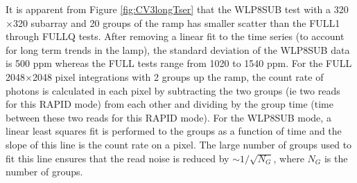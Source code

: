\documentclass{aastex62}
\begin{document}
It is apparent from Figure \ref{fig:CV3longTser} that the WLP8SUB test with a 320$\times$320 subarray and 20 groups of the ramp has smaller scatter than the FULL1 through FULLQ tests.
After removing a linear fit to the time series (to account for long term trends in the lamp), the standard deviation of the WLP8SUB data is 500 ppm whereas the FULL tests range from 1020 to 1540 ppm.
For the FULL 2048$\times$2048 pixel integrations with 2 groups up the ramp, the count rate of photons is calculated in each pixel by subtracting the two groups (ie two reads for this RAPID mode) from each other and dividing by the group time (time between these two reads for this RAPID mode).
For the WLP8SUB mode, a linear least squares fit is performed to the groups as a function of time and the slope of this line is the count rate on a pixel.
The large number of groups used to fit this line ensures that the read noise is reduced by $\sim 1/\sqrt{N_G}$, where $N_G$ is the number of groups.
\end{document}
